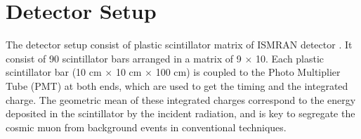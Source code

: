 \documentclass[twocolumn,amsmath,amssymb]{snp}
\begin{document}
\section*{Detector Setup} %
The detector setup consist of plastic scintillator matrix of ISMRAN detector \cite{rdey}. It consist of 90 scintillator bars arranged in a matrix of 9 $\times$ 10. Each plastic scintillator bar (10 cm $\times$ 10 cm $\times$ 100 cm) is coupled to the Photo Multiplier Tube (PMT) at both ends, which are used to get the timing and the integrated charge. The geometric mean of these integrated charges correspond to the energy deposited in the scintillator by the incident radiation, and is key to segregate the cosmic muon from background events in conventional techniques.

\end{document}
